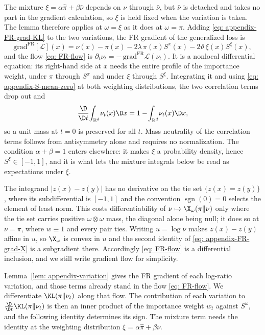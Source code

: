 \documentclass{article}
\begin{document}
The mixture $\xi=\alpha\hat\pi+\beta\bar\nu$ depends on $\nu$ through $\bar\nu$, but $\bar\nu$ is detached and takes no part in the gradient calculation, so $\xi$ is held fixed when the variation is taken. The lemma therefore applies at $\omega=\xi$ as it does at $\omega=\pi$. Adding \eqref{eq: appendix-FR-grad-KL} to the two variations, the FR gradient of the generalized loss is
\begin{equation*}
    \mathrm{grad}^{\mathrm{FR}}[\mathcal L](x) = \nu(x)-\pi(x) - 2\lambda\,\pi(x)S^{\pi}(x) - 2\vartheta\,\xi(x)S^{\xi}(x) ,
\end{equation*}
and the flow \eqref{eq: FR-flow} is $\partial_t\nu_t=-\,\mathrm{grad}^{\mathrm{FR}}\mathcal L(\nu_t)$. It is a nonlocal differential equation: its right-hand side at $x$ needs the entire profile of the importance weight, under $\pi$ through $S^{\pi}$ and under $\xi$ through $S^{\xi}$. Integrating it and using \eqref{eq: appendix-S-mean-zero} at both weighting distributions, the two correlation terms drop out and
\begin{equation*}
    \frac{\D}{\D t}\!\int_{\mathbb R^d}\!\nu_t(x)\D x = 1 - \!\int_{\mathbb R^d}\!\nu_t(x)\D x ,
\end{equation*}
so a unit mass at $t=0$ is preserved for all $t$. Mass neutrality of the correlation terms follows from antisymmetry alone and requires no normalization. The condition $\alpha+\beta=1$ enters elsewhere: it makes $\xi$ a probability density, hence $S^{\xi}\in[-1,1]$, and it is what lets the mixture integrals below be read as expectations under $\xi$.

\begin{remark}
\label{rem: appendix-subgradient}
The integrand $|z(x)-z(y)|$ has no derivative on the tie set $\{z(x)=z(y)\}$, where its subdifferential is $[-1,1]$ and the convention $\operatorname{sgn}(0)=0$ selects the element of least norm. This costs differentiability of $\nu\mapsto\X_\omega(\pi\|\nu)$ only where the tie set carries positive $\omega\otimes\omega$ mass, the diagonal alone being null; it does so at $\nu=\pi$, where $w\equiv1$ and every pair ties. Writing $u=\log\nu$ makes $z(x)-z(y)$ affine in $u$, so $\X_\omega$ is convex in $u$ and the second identity of \eqref{eq: appendix-FR-grad-X} is a subgradient there. Accordingly \eqref{eq: FR-flow} is a differential inclusion, and we still write gradient flow for simplicity.
\end{remark}

Lemma~\ref{lem: appendix-variation} gives the FR gradient of each log-ratio variation, and those terms already stand in the flow \eqref{eq: FR-flow}. We differentiate $\KL(\pi\|\nu_t)$ along that flow. The contribution of each variation to $\frac{\D}{\D t}\KL(\pi\|\nu_t)$ is then an inner product of the importance weight $w_t$ against $S^{\omega}$, and the following identity determines its sign. The mixture term needs the identity at the weighting distribution $\xi=\alpha\hat\pi+\beta\bar\nu$.
\end{document}
